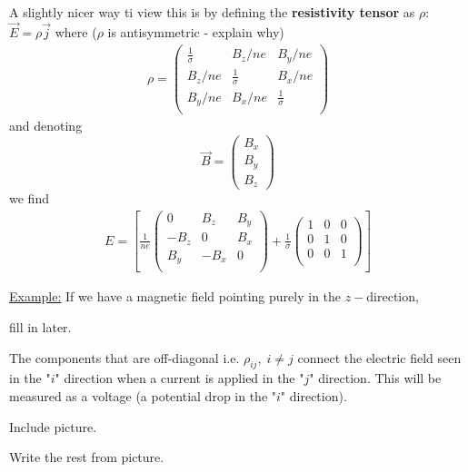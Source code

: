 \documentclass[11pt]{article}
\begin{document}
\\
\\
A slightly nicer way ti view this is by defining the \textbf{resistivity tensor} as $\rho$: $\vec{E} = \rho \vec{j}$ where 
($\rho$ is antisymmetric - explain why)
\begin{align*}
  \rho = \begin{pmatrix}
    \frac{1}{\sigma} & B_z/ne & B_y/ne \\
    B_z/ne  & \frac{1}{\sigma} & B_x/ne \\
    B_y/ne & B_x/ne & \frac{1}{\sigma} \\
  \end{pmatrix}
\end{align*} and denoting \[ \vec{B} = \begin{pmatrix}
  B_x \\ B_y \\ B_z
\end{pmatrix} \] we find 
\begin{align*}
  E = \left[  \frac{1}{ne} \begin{pmatrix}
    0 & B_z & B_y \\
    -B_z & 0 & B_x \\
    B_y & -B_x & 0 \\
  \end{pmatrix} + \frac{1}{\sigma} \begin{pmatrix}
    1 & 0 & 0 \\
    0 & 1 & 0 \\
    0 & 0 & 1 \\
  \end{pmatrix} \right]
\end{align*}

\underline{Example:} If we have a magnetic field pointing purely in the $z-$direction, 

\begin{center}
  fill in later.
\end{center}

The components that are off-diagonal i.e. $\rho_{ij},\; i \neq j$ connect the electric field seen in the "$i$" direction when a current is applied in the "$j$" direction. This will be measured as a voltage (a potential drop in the "$i$" direction).
\begin{center}
  Include picture.
\end{center}

Write the rest from picture.


\pagebreak
\end{document}
